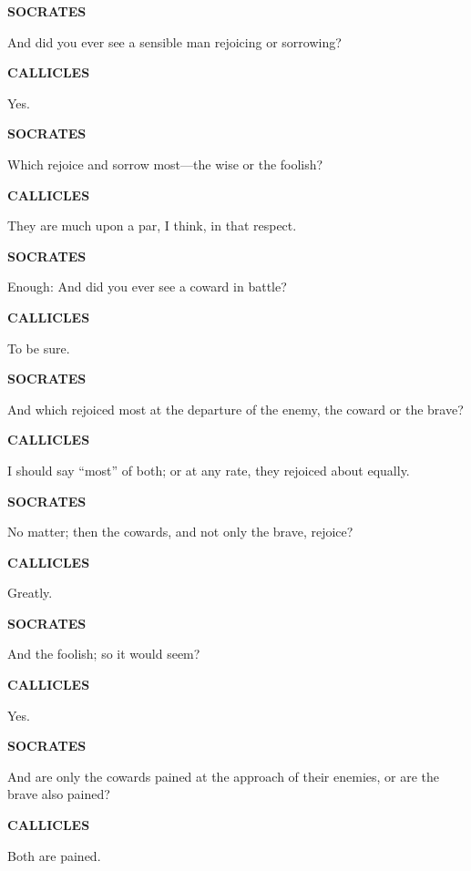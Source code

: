 \documentclass[11pt,letter]{article}
\begin{document}
\par \textbf{SOCRATES}
\par   And did you ever see a sensible man rejoicing or sorrowing?

\par \textbf{CALLICLES}
\par   Yes.

\par \textbf{SOCRATES}
\par   Which rejoice and sorrow most—the wise or the foolish?

\par \textbf{CALLICLES}
\par   They are much upon a par, I think, in that respect.

\par \textbf{SOCRATES}
\par   Enough:  And did you ever see a coward in battle?

\par \textbf{CALLICLES}
\par   To be sure.

\par \textbf{SOCRATES}
\par   And which rejoiced most at the departure of the enemy, the coward or the brave?

\par \textbf{CALLICLES}
\par   I should say “most” of both; or at any rate, they rejoiced about equally.

\par \textbf{SOCRATES}
\par   No matter; then the cowards, and not only the brave, rejoice?

\par \textbf{CALLICLES}
\par   Greatly.

\par \textbf{SOCRATES}
\par   And the foolish; so it would seem?

\par \textbf{CALLICLES}
\par   Yes.

\par \textbf{SOCRATES}
\par   And are only the cowards pained at the approach of their enemies, or are the brave also pained?

\par \textbf{CALLICLES}
\par   Both are pained.
\end{document}
